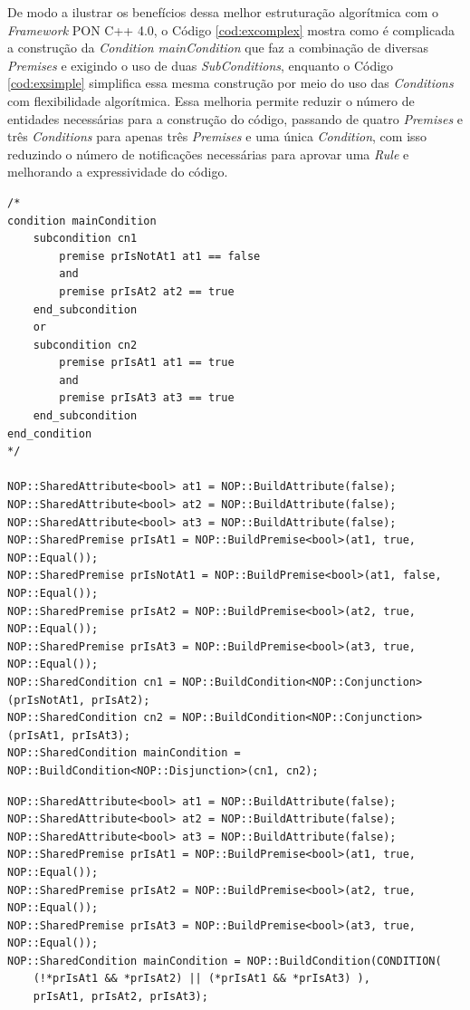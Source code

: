 De modo a ilustrar os benefícios dessa melhor estruturação algorítmica com o
\textit{Framework} PON C++ 4.0, o Código \ref{cod:excomplex} mostra como é
complicada a construção da \textit{Condition} \textit{mainCondition} que faz a
combinação de diversas \textit{Premises} e exigindo o uso de duas
\textit{SubConditions}, enquanto o Código \ref{cod:exsimple} simplifica essa
mesma construção por meio do uso das \textit{Conditions} com flexibilidade
algorítmica. Essa melhoria permite reduzir o número de entidades necessárias
para a construção do código, passando de quatro \textit{Premises} e três
\textit{Conditions} para apenas três \textit{Premises} e uma única
\textit{Condition}, com isso reduzindo o número de notificações necessárias para
aprovar uma \textit{Rule} e melhorando a expressividade do código.

\begin{lstlisting}[caption = {Construção complexa de \textit{Condition} com o \textit{Framework} PON C++ 4.0},
source = {Autoria própria}, %float=htb,
label = {cod:excomplex},
]
/*
condition mainCondition
    subcondition cn1
        premise prIsNotAt1 at1 == false
        and
        premise prIsAt2 at2 == true
    end_subcondition
    or
    subcondition cn2
        premise prIsAt1 at1 == true 
        and
        premise prIsAt3 at3 == true
    end_subcondition
end_condition
*/

NOP::SharedAttribute<bool> at1 = NOP::BuildAttribute(false);
NOP::SharedAttribute<bool> at2 = NOP::BuildAttribute(false);
NOP::SharedAttribute<bool> at3 = NOP::BuildAttribute(false);
NOP::SharedPremise prIsAt1 = NOP::BuildPremise<bool>(at1, true, NOP::Equal());
NOP::SharedPremise prIsNotAt1 = NOP::BuildPremise<bool>(at1, false, NOP::Equal());
NOP::SharedPremise prIsAt2 = NOP::BuildPremise<bool>(at2, true, NOP::Equal());
NOP::SharedPremise prIsAt3 = NOP::BuildPremise<bool>(at3, true, NOP::Equal());
NOP::SharedCondition cn1 = NOP::BuildCondition<NOP::Conjunction>(prIsNotAt1, prIsAt2);
NOP::SharedCondition cn2 = NOP::BuildCondition<NOP::Conjunction>(prIsAt1, prIsAt3);
NOP::SharedCondition mainCondition = NOP::BuildCondition<NOP::Disjunction>(cn1, cn2);

\end{lstlisting}

\begin{lstlisting}[caption = {Construção simplificada de \textit{Condition} com o \textit{Framework} PON C++ 4.0},
source = {Autoria própria}, float=htb,
label = {cod:exsimple},
]
NOP::SharedAttribute<bool> at1 = NOP::BuildAttribute(false);
NOP::SharedAttribute<bool> at2 = NOP::BuildAttribute(false);
NOP::SharedAttribute<bool> at3 = NOP::BuildAttribute(false);
NOP::SharedPremise prIsAt1 = NOP::BuildPremise<bool>(at1, true, NOP::Equal());
NOP::SharedPremise prIsAt2 = NOP::BuildPremise<bool>(at2, true, NOP::Equal());
NOP::SharedPremise prIsAt3 = NOP::BuildPremise<bool>(at3, true, NOP::Equal());
NOP::SharedCondition mainCondition = NOP::BuildCondition(CONDITION(
    (!*prIsAt1 && *prIsAt2) || (*prIsAt1 && *prIsAt3) ),
    prIsAt1, prIsAt2, prIsAt3);
\end{lstlisting}

